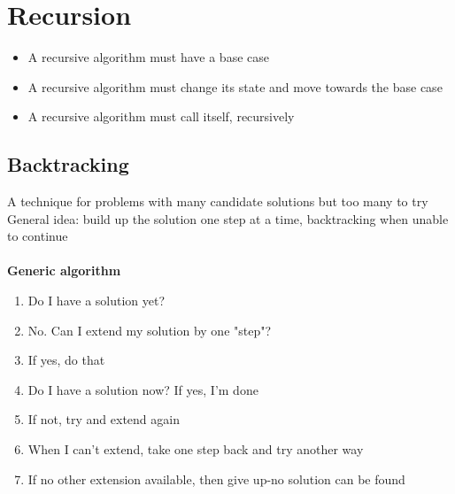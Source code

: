 \documentclass{article}[18pt]
\begin{document}
\section{Recursion}
\begin{itemize}
	\item A recursive algorithm must have a base case
	\item A recursive algorithm must change its state and move towards the base case
	\item A recursive algorithm must call itself, recursively
\end{itemize}
\subsection{Backtracking}
A technique for problems with many candidate solutions but too many to try\\
General idea: build up the solution one step at a time, backtracking when unable to continue\\
\\
\textbf{Generic algorithm}
\begin{enumerate}
	\item Do I have a solution yet?
	\item No. Can I extend my solution by one "step"?
	\item If yes, do that
	\item Do I have a solution now? If yes, I'm done
	\item If not, try and extend again
	\item When I can't extend, take one step back and try another way
	\item If no other extension available, then give up-no solution can be found
\end{enumerate}
\end{document}
